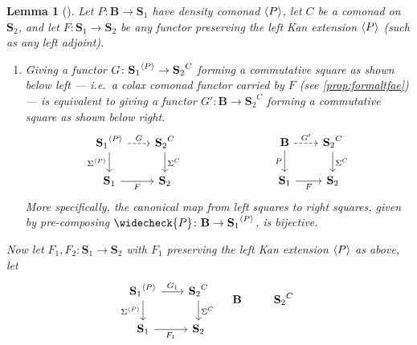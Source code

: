 \documentclass[11pt, oneside, article]{memoir}
\theoremstyle{plain}
\newtheorem{lemma}[theorem]{Lemma}
\theoremstyle{definition}
\theoremstyle{remark}
\DeclarePairedDelimiter{\gen}{\langle}{\rangle}
\newcommand{\cat}[1]{\mathbf{#1}}
\newcommand{\CoalgOn}[2]{{#2}^{#1}}
\newcommand{\lift}[1]{\widecheck{#1}}
\newcommand{\carr}{\Sigma}
\newcommand{\car}[1]{\carr^{#1}}
\newcommand{\carC}{\car{\cC}}
\newcommand{\carP}{\car{\cP}}
\newcommand{\ph}[1]{#1}
\newcommand{\cmnd}[1]{{#1}}
\newcommand{\cC}{\cmnd{C}}
\newcommand{\bB}{\cat{B}}
\newcommand{\bS}{\cat{S}}
\newcommand{\pP}{\ph{P}}
\newcommand{\cP}{\gen{\pP}}
\newcommand{\lP}{\lift{\pP}}
\begin{document}
\begin{lemma}[{\cite[Proposition 7.6]{fairbanks:monads}}]\label{lem:densityformaltfae}
  Let $\pP \colon \bB \to \bS_1$ have density comonad $\cP$, let $\cC$
  be a comonad on $\bS_2$, and let $F \colon \bS_1 \to \bS_2$ be any
  functor preserving the left Kan extension $\cP$ (such as any left
  adjoint).
  
  \begin{enumerate}[label=(\roman*)]
  \item Giving a functor
    $G \colon \CoalgOn{\cP}{\bS_1} \to \CoalgOn{\cC}{\bS_2}$ forming a
    commutative square as shown below left --- i.e.\ a \emph{colax
      comonad functor} carried by $F$ (see \cref{prop:formaltfae}) ---
    is equivalent to giving a functor
    $G' \colon \bB \to \CoalgOn{\cC}{\bS_2}$ forming a commutative
    square as shown below right.
    \[
      \begin{tikzcd}[column sep=20]
        \CoalgOn{\cP}{\bS_1} & \CoalgOn{\cC}{\bS_2} \\
        {\bS_1} & {\bS_2}
        \arrow["G",dashed, from=1-1, to=1-2]
        \arrow["\carP"', from=1-1, to=2-1]
        \arrow["\carC", from=1-2, to=2-2]
        \arrow["F"', from=2-1, to=2-2]
      \end{tikzcd}
      \qquad\qquad\qquad\qquad
      \begin{tikzcd}[column sep=20]
        \bB & \CoalgOn{\cC}{\bS_2} \\
        {\bS_1} & {\bS_2}
        \arrow["G'", dashed, from=1-1, to=1-2]
        \arrow["\pP"', from=1-1, to=2-1]
        \arrow["\carC", from=1-2, to=2-2]
        \arrow["F"', from=2-1, to=2-2]
      \end{tikzcd}
    \]
    More specifically, the canonical map from left squares to right
    squares, given by pre-composing
    $\lP \colon \bB \to \CoalgOn{\cP}{\bS_1}$, is bijective.
  \end{enumerate}
  Now let $F_1, F_2\colon \bS_1 \to \bS_2$ with $F_1$ preserving the
  left Kan extension $\cP$ as above, let
  \[
    \begin{tikzcd}[column sep=20]
      \CoalgOn{\cP}{\bS_1} & \CoalgOn{\cC}{\bS_2} \\
      {\bS_1} & {\bS_2}
      \arrow["G_1", from=1-1, to=1-2]
      \arrow["\carP"', from=1-1, to=2-1]
      \arrow["\carC", from=1-2, to=2-2]
      \arrow["F_1"', from=2-1, to=2-2]
    \end{tikzcd}
    \quad
    \begin{tikzcd}[column sep=20]
      \bB & \CoalgOn{\cC}{\bS_2} \\

\end{tikzcd}\]
\end{lemma}
\end{document}
